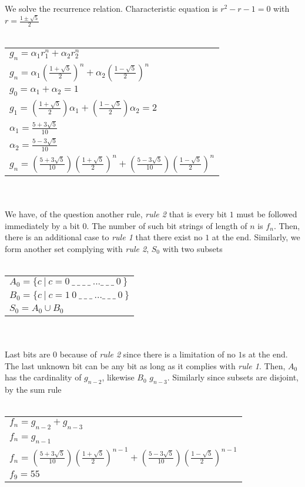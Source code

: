 \documentclass[12pt]{article}
\begin{document}
\\ \\
We solve the recurrence relation. Characteristic equation is $r^2-r-1=0$ with $r=\frac{1\pm \sqrt{5}}{2}$
\\ \\
\begin{tabular}{l}
    $g_n=\alpha_1r_1^n+\alpha_2r_2^n$\\
    $g_n=\alpha_1(\frac{1+ \sqrt{5}}{2})^n+\alpha_2(\frac{1- \sqrt{5}}{2})^n$\\
    $g_0=\alpha_1+\alpha_2=1$\\
    $g_1=(\frac{1+ \sqrt{5}}{2})\alpha_1+(\frac{1- \sqrt{5}}{2})\alpha_2=2$\\
    $\alpha_1=\frac{5+ 3\sqrt{5}}{10}$\\
    $\alpha_2=\frac{5- 3\sqrt{5}}{10}$\\
    $g_n=(\frac{5+ 3\sqrt{5}}{10})(\frac{1+ \sqrt{5}}{2})^n+(\frac{5- 3\sqrt{5}}{10})(\frac{1- \sqrt{5}}{2})^n$\\
\end{tabular} 
\\ \\
We have, of the question another rule, \textit{rule 2} that is every bit $1$ must be followed immediately by a bit $0$.
The number of such bit strings of length of $n$ is $f_n$. 
Then, there is an additional case to \textit{rule 1} that there exist no $1$ at the end.
Similarly, we form another set complying with \textit{rule 2}, $S_0$ with two subsets
\\ \\
\begin{tabular}{l}
    $A_0=\{c\ |\ c=0\ \_\ \_\ \_\ \_\ ...\_\ \_\ \_\ 0\ \} $\\
    $B_0=\{c\ |\ c=1\ 0\ \_\ \_\ \_\ ...\_\ \_\ \_\ 0\ \} $\\
    $S_0=A_0\cup B_0$\\
\end{tabular}
\\ \\
Last bits are $0$ because of \textit{rule 2} since there is a limitation of no $1$s at the end.
The last unknown bit can be any bit as long as it complies with \textit{rule 1}.
Then, $A_0$ has the cardinality of $g_{n-2}$, likewise $B_0$ $g_{n-3}$. Similarly since subsets are 
disjoint, by the sum rule
\\ \\
\begin{tabular}{l}
    $f_n=g_{n-2} + g_{n-3}$\\
    $f_n=g_{n-1}$\\
    $f_n=(\frac{5+ 3\sqrt{5}}{10})(\frac{1+ \sqrt{5}}{2})^{n-1}+(\frac{5- 3\sqrt{5}}{10})(\frac{1- \sqrt{5}}{2})^{n-1}$\\
    $f_9=55$\\
\end{tabular}
\end{document}
